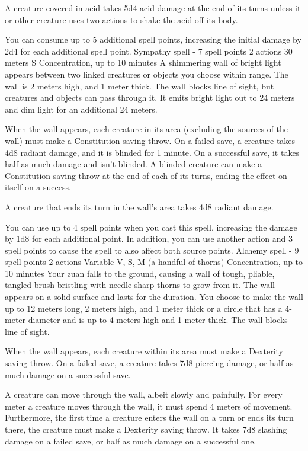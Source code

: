     A creature covered in acid takes 5d4 acid damage at the end of its turns unless it or other creature uses two actions to shake the acid off its body.

    You can consume up to 5 additional spell points, increasing the initial damage by 2d4 for each additional spell point.
    {Sympathy spell - 7 spell points}
    {2 actions}
    {30 meters}
    {S}
    {Concentration, up to 10 minutes}
    A shimmering wall of bright light appears between two linked creatures or objects you choose within range.
    The wall is 2 meters high, and 1 meter thick.
    The wall blocks line of sight, but creatures and objects can pass through it.
    It emits bright light out to 24 meters and dim light for an additional 24 meters.

    When the wall appears, each creature in its area (excluding the sources of the wall) must make a Constitution saving throw.
    On a failed save, a creature takes 4d8 radiant damage, and it is blinded for 1 minute.
    On a successful save, it takes half as much damage and isn't blinded.
    A blinded creature can make a Constitution saving throw at the end of each of its turns, ending the effect on itself on a success.

    A creature that ends its turn in the wall's area takes 4d8 radiant damage.

    You can use up to 4 spell points when you cast this spell, increasing the damage by 1d8 for each additional point.
    In addition, you can use another action and 3 spell points to cause the spell to also affect both source points.
    {Alchemy spell - 9 spell points}
    {2 actions}
    {Variable}
    {V, S, M (a handful of thorns)}
    {Concentration, up to 10 minutes}
    Your zuan falls to the ground, causing a wall of tough, pliable, tangled brush bristling with needle-sharp thorns to grow from it.
    The wall appears on a solid surface and lasts for the duration.
    You choose to make the wall up to 12 meters long, 2 meters high, and 1 meter thick or a circle that has a 4-meter diameter and is up to 4 meters high and 1 meter thick.
    The wall blocks line of sight.

    When the wall appears, each creature within its area must make a Dexterity saving throw.
    On a failed save, a creature takes 7d8 piercing damage, or half as much damage on a successful save.

    A creature can move through the wall, albeit slowly and painfully.
    For every meter a creature moves through the wall, it must spend 4 meters of movement.
    Furthermore, the first time a creature enters the wall on a turn or ends its turn there, the creature must make a Dexterity saving throw.
    It takes 7d8 slashing damage on a failed save, or half as much damage on a successful one.

